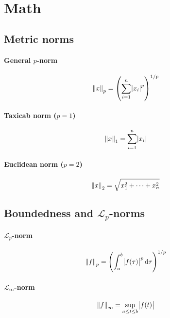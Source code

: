 \section{Math}

\subsection{Metric norms}
\paragraph{General $p$-norm}
\begin{equation}
	\norm{x}_p
	=
	\left(
		\sum_{i=1}^{n} \abs{x_i}^p
	\right)
	^{1/p}
\end{equation}

\paragraph{Taxicab norm ($p=1$)}
\begin{equation}
	\norm{x}_1
	=
	\sum_{i=1}^{n} \abs{x_i}
\end{equation}

\paragraph{Euclidean norm ($p=2$)}
\begin{equation}
	\norm{x}_2
	=
	\sqrt{x_1^2 + \cdots + x_n^2}
\end{equation}

\subsection[\texorpdfstring{Boundedness and $\mathcal{L}_p$-norms}
	{Boundedness and Lp-norms}]
	{Boundedness and $\mathcal{L}_p$-norms}
\paragraph{$\mathcal{L}_p$-norm}
\begin{equation}
	\norm{f}_p
	=
	\left(
		\int_a^b \abs{f(\tau)}^p \dif \tau
	\right)^{1/p}
\end{equation}

\paragraph{$\mathcal{L}_\infty$-norm}
\begin{equation}
	\norm{f}_\infty
	=
	\sup_{a \leq t \leq b} \abs{f(t)}
\end{equation}

